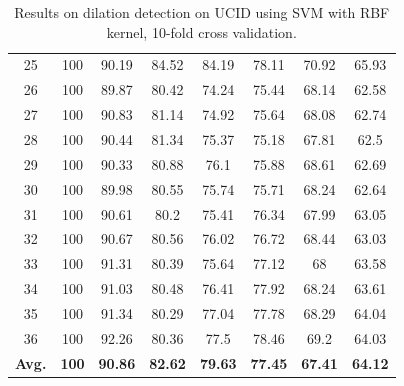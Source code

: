 \documentclass[review]{elsarticle}
\begin{document}
\begin{table}[!t]
\begin{minipage}{0.48\linewidth}
{\begin{tabular}{c|ccccccc}
				25&100&90.19&84.52&84.19&78.11&70.92&65.93\\
				26&100&89.87&80.42&74.24&75.44&68.14&62.58\\
				27&100&90.83&81.14&74.92&75.64&68.08&62.74\\
				28&100&90.44&81.34&75.37&75.18&67.81&62.5\\
				29&100&90.33&80.88&76.1&75.88&68.61&62.69\\
				30&100&89.98&80.55&75.74&75.71&68.24&62.64\\
				31&100&90.61&80.2&75.41&76.34&67.99&63.05\\
				32&100&90.67&80.56&76.02&76.72&68.44&63.03\\
				33&100&91.31&80.39&75.64&77.12&68&63.58\\
				34&100&91.03&80.48&76.41&77.92&68.24&63.61\\
				35&100&91.34&80.29&77.04&77.78&68.29&64.04\\
				36&100&92.26&80.36&77.5&78.46&69.2&64.03\\
				\hline
				\textbf{Avg.}&\textbf{100}&\textbf{90.86}&\textbf{82.62}&\textbf{79.63}&\textbf{77.45}&\textbf{67.41}&\textbf{64.12}\\
				\hline\hline	
		\end{tabular}}
	\end{minipage}
	\begin{minipage}{0.48\linewidth}
		\centering
		\caption{Results on dilation detection on UCID using SVM with RBF kernel, 10-fold cross validation.}
		\label{table:uciddilation}
\end{minipage}
\end{table}
\end{document}

